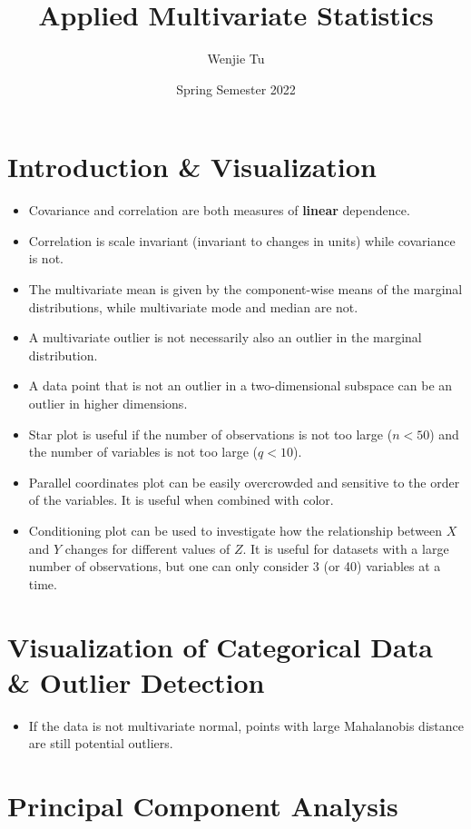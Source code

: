 \documentclass[a4paper]{article}
\title{%
    Applied Multivariate Statistics
}
\author{Wenjie Tu}
\date{Spring Semester 2022}
\begin{document}

\section{Introduction \& Visualization}

\begin{itemize}
    \item Covariance and correlation are both measures of \textbf{linear} dependence.
    \item Correlation is scale invariant (invariant to changes in units) while covariance is not.
    \item The multivariate mean is given by the component-wise means of the marginal distributions, while multivariate mode and median are not.
    \item A multivariate outlier is not necessarily also an outlier in the marginal distribution.
    \item A data point that is not an outlier in a two-dimensional subspace can be an outlier in higher dimensions.
    \item Star plot is useful if the number of observations is not too large ($n<50$) and the number of variables is not too large ($q<10$).
    \item Parallel coordinates plot can be easily overcrowded and sensitive to the order of the variables. It is useful when combined with color.
    \item Conditioning plot can be used to investigate how the relationship between $X$ and $Y$ changes for different values of $Z$. It is useful for datasets with a large number of observations, but one can only consider 3 (or 40) variables at a time.
\end{itemize}

\section{Visualization of Categorical Data \& Outlier Detection}

\begin{itemize}
    \item If the data is not multivariate normal, points with large Mahalanobis distance are still potential outliers.
\end{itemize}

\section{Principal Component Analysis}
\end{document}
